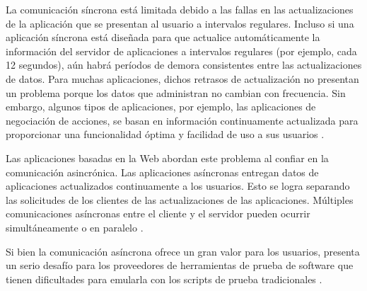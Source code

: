 La comunicación síncrona está limitada debido a las fallas en las actualizaciones de la aplicación que se presentan al usuario a intervalos regulares. Incluso si una aplicación síncrona está diseñada para que actualice automáticamente la información del servidor de aplicaciones a intervalos regulares (por ejemplo, cada 12 segundos), aún habrá períodos de demora consistentes entre las actualizaciones de datos. Para muchas aplicaciones, dichos retrasos de actualización no presentan un problema porque los datos que administran no cambian con frecuencia. Sin embargo, algunos tipos de aplicaciones, por ejemplo, las aplicaciones de negociación de acciones, se basan en información continuamente actualizada para proporcionar una funcionalidad óptima y facilidad de uso a sus usuarios \cite{s/a communication}.
\\ \par
Las aplicaciones basadas en la Web abordan este problema al confiar en la comunicación asincrónica. Las aplicaciones asíncronas entregan datos de aplicaciones actualizados continuamente a los usuarios. Esto se logra separando las solicitudes de los clientes de las actualizaciones de las aplicaciones. Múltiples comunicaciones asíncronas entre el cliente y el servidor pueden ocurrir simultáneamente o en paralelo \cite{s/a communication}.
\\ \par
Si bien la comunicación asíncrona ofrece un gran valor para los usuarios, presenta un serio desafío para los proveedores de herramientas de prueba de software que tienen dificultades para emularla con los scripts de prueba tradicionales \cite{s/a communication}.





